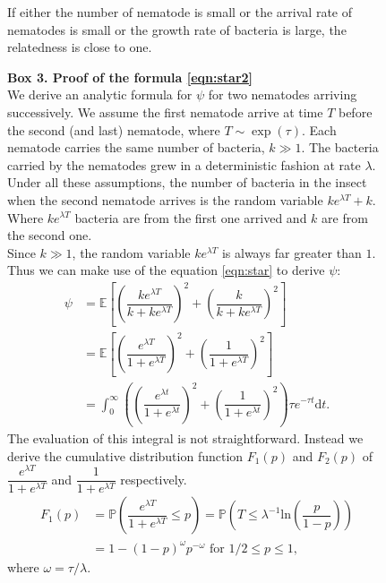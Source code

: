\documentclass[10pt]{article}
\newcommand{\ud}{{\mathrm{d}}}
\newcommand{\pr}{{\mathbb{P}}}
\newcommand{\psic}{\psi}
\begin{document}
\begin{multicols}{2}
\begin{figure}[hbt!]
{If either the number of nematode is small or the arrival rate of nematodes is small or the growth rate of bacteria is large, the relatedness is close to one.\label{fig:R}}
\end{figure}
\begin{figure}[hbt!]
\begin{mdframed}
\begin{multicols}{2}
\textbf{Box 3. Proof of  the formula \eqref{eqn:star2}\\}
\label{box:psi_consecutive}
We derive an analytic formula for $\psic$ for two nematodes arriving successively.
We assume the first nematode arrive at time $T$ before the second (and last) nematode, where $T\sim \exp ( \tau)$.
Each nematode carries the same number of bacteria, $k \gg 1$.
The bacteria carried by the nematodes grew in a deterministic fashion at rate $\lambda$.
Under all these assumptions, the number of bacteria in the insect when the second nematode arrives is the random variable $k e^{\lambda  T}+k$.
Where $k e^{\lambda  T}$ bacteria are from the first one arrived and $k$ are from the second one.\\
  Since $k \gg 1$, the random variable $k e^{\lambda  T} $ is always far greater than $1$.
  Thus we can make use of the equation \eqref{eqn:star} to derive $\psic$:
  \begin{align}
  \psic  &=\mathbb{E} \left[ \left( \dfrac{ k e^{\lambda T}}{k+ke^{\lambda T}} \right)^2+\left( \dfrac{k}{k+ke^{\lambda T}} \right)^2 \right] \\
  &=\mathbb{E} \left[ \left( \dfrac{ e^{\lambda T}}{1+e^{\lambda T}} \right)^2+\left( \dfrac{1}{1+e^{\lambda T}} \right)^2 \right] \\
  &=\int_0^\infty \left( \left( \dfrac{ e^{\lambda t}}{1+e^{\lambda t}} \right)^2 + \left( \dfrac{1}{1+e^{\lambda t}} \right)^2 \right) \tau e^{ -\tau t } \ud t.
  \end{align}
  The evaluation of this integral is not straightforward.
  Instead we derive the cumulative distribution function $F_1(p)$ and $F_2(p)$ of $\dfrac{ e^{\lambda T}}{1+e^{\lambda T}}$ and $\dfrac{ 1}{1+e^{\lambda T}}$ respectively.
  \begin{align}
  F_1(p) &= \pr \left(\dfrac{e^{\lambda T}}{1+e^{\lambda T}} \leq p\right)= \pr \left(T \leq \lambda^{-1} \mathrm{ln}\left( \dfrac{p}{1-p} \right) \right) \nonumber \\
  &= 1-(1-p)^{\omega} p^{-\omega} \text{ for } 1/2 \leq p \leq 1,
  \end{align}
  where $\omega=\tau / \lambda$.

\end{multicols}
\end{mdframed}
\end{figure}
\end{multicols}
\end{document}
